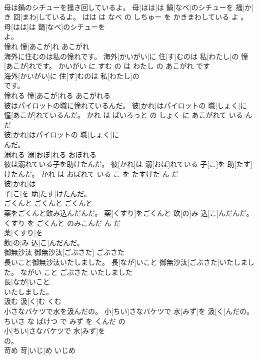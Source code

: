 \documentclass[8pt]{extreport}
\begin{document}
\begin{CJK}{UTF8}{min}
\\	母は鍋のシチューを掻き回しているよ。	母[はは]は 鍋[なべ]のシチューを 掻[か]き 回[まわ]しているよ。	はは は なべ の しちゅー を かきまわしている よ 。	
\\	母[はは]は 鍋[なべ]のシチューを
\\	よ。			
\\	憧れ	憧[あこが]れ	あこがれ	
\\	海外に住むのは私の憧れです。	海外[かいがい]に 住[す]むのは 私[わたし]の 憧[あこが]れです。	かいがい に すむ の は わたし の あこがれ です	
\\	海外[かいがい]に 住[す]むのは 私[わたし]の
\\	です。			
\\	憧れる	憧[あこが]れる	あこがれる	
\\	彼はパイロットの職に憧れているんだ。	彼[かれ]はパイロットの 職[しょく]に 憧[あこが]れているんだ。	かれ は ぱいろっと の しょく に あこがれて いる ん だ	
\\	彼[かれ]はパイロットの 職[しょく]に
\\	んだ。			
\\	溺れる	溺[おぼ]れる	おぼれる	
\\	彼は溺れている子を助けたんだ。	彼[かれ]は 溺[おぼ]れている 子[こ]を 助[たす]けたんだ。	かれ は おぼれて いる こ を たすけた ん だ	
\\	彼[かれ]は
\\	子[こ]を 助[たす]けたんだ。			
\\	ごくんと	ごくんと	ごくんと	
\\	薬をごくんと飲み込んだんだ。	薬[くすり]をごくんと 飲[の]み 込[こ]んだんだ。	くすり を ごくんと のみこんだ ん だ	
\\	薬[くすり]を
\\	飲[の]み 込[こ]んだんだ。			
\\	御無沙汰	御無沙汰[ごぶさた]	ごぶさた	
\\	長いこと御無沙汰いたしました。	長[なが]いこと 御無沙汰[ごぶさた]いたしました。	ながい こと ごぶさた いたしました	
\\	長[なが]いこと
\\	いたしました。			
\\	汲む	汲[く]む	くむ	
\\	小さなバケツで水を汲んだの。	小[ちい]さなバケツで 水[みず]を 汲[く]んだの。	ちいさ な ばけつ で みず を くんだ の	
\\	小[ちい]さなバケツで 水[みず]を
\\	の。			
\\	苛め	苛[いじ]め	いじめ	

\end{CJK}
\end{document}
